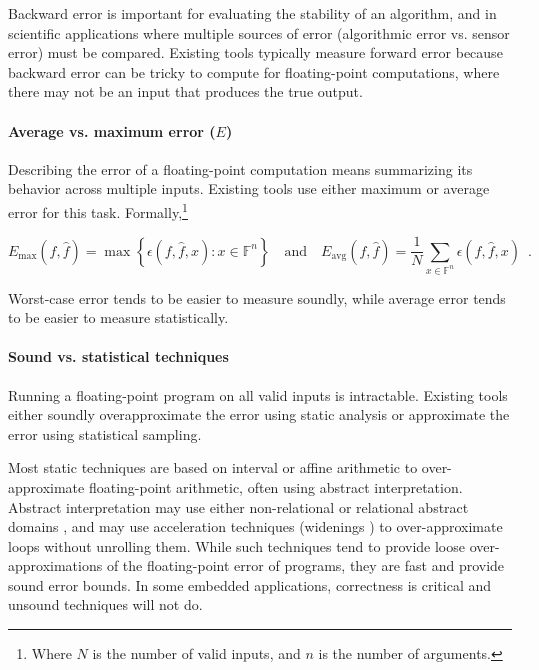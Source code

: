\documentclass[main.tex]{subfiles}
\begin{document}
Backward error is important for evaluating the stability of an algorithm,
  and in scientific applications where multiple sources of error
  (algorithmic error vs. sensor error) must be compared.
Existing tools typically measure forward error
  because backward error can be tricky to compute
  for floating-point computations,
  where there may not be an input that produces the true output.

\paragraph{Average vs. maximum error ($E$)}

Describing the error of a floating-point computation
  means summarizing its behavior across multiple inputs.
Existing tools use either maximum or average error for this task.
Formally,\footnote{Where $N$ is the number of valid inputs, and $n$ is the number of arguments.}

\begin{equation*}
  E_{\text{max}}(f, \hat{f}) = \max \left\{\epsilon(f, \hat{f}, x) : x \in \mathbb{F}^n\right\}
  \quad \text{and} \quad
  E_{\text{avg}}(f, \hat{f}) = \frac{1}{N} \sum_{x\in \mathbb{F}^n} \epsilon(f, \hat{f}, x) \enspace .
\end{equation*}

Worst-case error tends to be easier to measure soundly,
  while average error tends to be easier to measure statistically.

\paragraph{Sound vs. statistical techniques}

Running a floating-point program on all valid inputs is intractable.
Existing tools
  either soundly overapproximate the error using static analysis
  or approximate the error using statistical sampling.

Most static techniques are based on interval or affine arithmetic
  to over-approximate floating-point arithmetic,
  often using abstract interpretation.
Abstract interpretation may use either non-relational \cite{Mar05}
  or relational abstract domains \cite{AGW15,Cha10,GP11},
  and may use acceleration techniques (widenings \cite{CC92})
  to over-approximate loops without unrolling them.
While such techniques tend to provide loose over-approximations
of the floating-point error of programs, they are fast and
provide sound error bounds. In some embedded applications,
correctness is critical and unsound techniques will not do.
\end{document}
